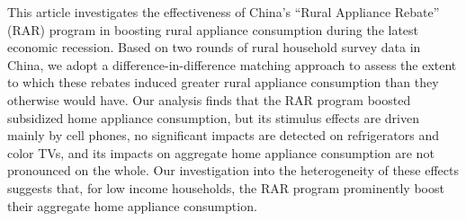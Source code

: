 This article investigates the effectiveness of China’s “Rural Appliance Rebate” (RAR) program in boosting rural appliance consumption during the latest economic recession. Based on two rounds of rural household survey data in China, we adopt a difference-in-difference matching approach to assess the extent to which these rebates induced greater rural appliance consumption than they otherwise would have. Our analysis finds that the RAR program boosted subsidized home appliance consumption, but its stimulus effects are driven mainly by cell phones, no significant impacts are detected on refrigerators and color TVs, and its impacts on aggregate home appliance consumption are not pronounced on the whole. Our investigation into the heterogeneity of these effects suggests that, for low income households, the RAR program prominently boost their aggregate home appliance consumption.